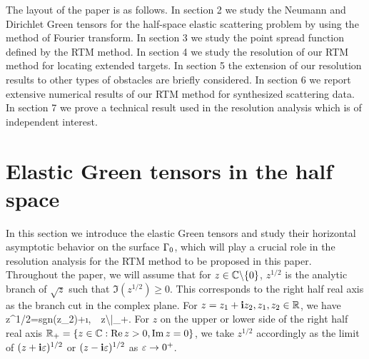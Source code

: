 \documentclass[12pt]{iopart}
\begin{document}
The layout of the paper is as follows. In section 2 we study the Neumann and Dirichlet Green tensors for the half-space elastic scattering problem by using the method of Fourier transform. In section 3 we study the point spread function defined by the RTM method. In section 4 we study the resolution of our RTM method for locating extended targets. In section 5 the extension of our resolution results to other types of obstacles are briefly considered. In section 6 we report extensive numerical results of our RTM method
for synthesized scattering data. In section 7 we prove a technical result used in the resolution analysis which is of independent interest.

\section{Elastic Green tensors in the half space}

In this section we introduce the elastic Green tensors and study their horizontal asymptotic behavior on the surface $\Gamma_0$, which will play a crucial role in the resolution analysis for the RTM method to be proposed in this paper. Throughout the paper, we will assume that for $z\in\mathbb{C}\backslash\{0\}$, $z^{1/2}$ is the analytic branch of $\sqrt{z}$ such that $\Im (z^{1/2})\geq0$. This corresponds to the right half real axis as the branch cut in the complex plane. For $z=z_1+\mathbf{i} z_2,z_1,z_2\in\mathbb{R}$, we have
\be \label{convention_1}
z^{1/2}={\rm sgn}(z_2)+\i{},\ \ \forall z\in\C\backslash\bar{\R}_+.
\ee
For $z$ on the upper or lower side of the right half real axis $\mathbb{R}_+=\{z\in{\mathbb{C}}:\mathrm{Re}\, z>0,\mathrm{Im}\, z=0\}$, we take $z^{1/2}$ accordingly as the limit of $(z+\mathbf{i}\varepsilon)^{1/2}$ or $(z-\mathbf{i}\varepsilon)^{1/2}$ as $\varepsilon \to 0^+$.
\end{document}
